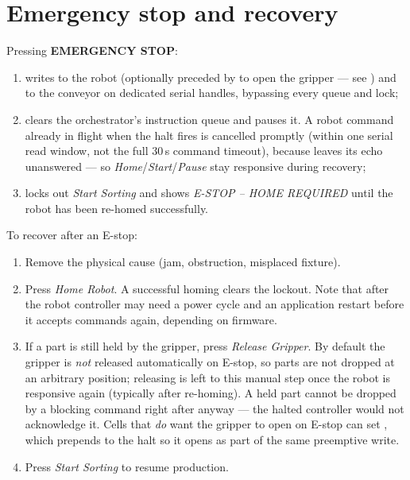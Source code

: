 \section{Emergency stop and recovery}
\label{sec:estop}
%
Pressing \textbf{EMERGENCY STOP}:
\begin{enumerate}
  \item writes  to the robot (optionally preceded by  to
    open the gripper --- see ) and 
    to the conveyor on dedicated serial handles, bypassing every queue and
    lock;
  \item clears the orchestrator's instruction queue and pauses it. A robot
    command already in flight when the halt fires is cancelled promptly
    (within one serial read window, not the full 30\,s command timeout),
    because  leaves its  echo unanswered --- so
    \emph{Home}/\emph{Start}/\emph{Pause} stay responsive during recovery;
  \item locks out \emph{Start Sorting} and shows
    \emph{E-STOP -- HOME REQUIRED} until the robot has been re-homed
    successfully.
\end{enumerate}

To recover after an E-stop:
\begin{enumerate}
  \item Remove the physical cause (jam, obstruction, misplaced fixture).
  \item Press \emph{Home Robot}. A successful homing clears the lockout.
    Note that after  the robot controller may need a power
    cycle and an application restart before it accepts commands again,
    depending on firmware.
  \item If a part is still held by the gripper, press \emph{Release
    Gripper}. By default the gripper is \emph{not} released automatically on
    E-stop, so parts are not dropped at an arbitrary position; releasing is
    left to this manual step once the robot is responsive again (typically
    after re-homing). A held part cannot be dropped by a blocking command
    right after  anyway --- the halted controller would not
    acknowledge it. Cells that \emph{do} want the gripper to open on E-stop
    can set , which prepends
     to the halt so it opens as part of the same preemptive write.
  \item Press \emph{Start Sorting} to resume production.
\end{enumerate}

